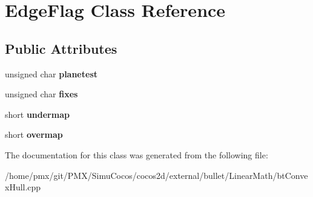 \hypertarget{classEdgeFlag}{}\section{Edge\+Flag Class Reference}
\label{classEdgeFlag}
\subsection*{Public Attributes}
\begin{DoxyCompactItemize}
\item 
\mbox{\label{classEdgeFlag_a6e5372d1cf36447c801442308c2a0d32}} 
unsigned char {\bfseries planetest}
\item 
\mbox{\label{classEdgeFlag_ad681ddcf6f44c3936f1a4efba07f7f30}} 
unsigned char {\bfseries fixes}
\item 
\mbox{\label{classEdgeFlag_a569af1bad9bd0be9504b010f220b2b9b}} 
short {\bfseries undermap}
\item 
\mbox{\label{classEdgeFlag_a3a58eb62c97e43c4f8fbf578d117e436}} 
short {\bfseries overmap}
\end{DoxyCompactItemize}


The documentation for this class was generated from the following file\+:\begin{DoxyCompactItemize}
\item 
/home/pmx/git/\+P\+M\+X/\+Simu\+Cocos/cocos2d/external/bullet/\+Linear\+Math/bt\+Convex\+Hull.\+cpp\end{DoxyCompactItemize}
